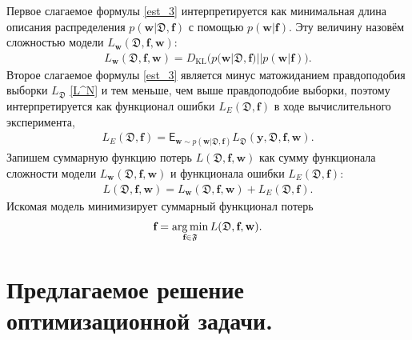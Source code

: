 \documentclass[12pt, fleqn, unicode]{article}
\newcommand{\PP}{p}
\newcommand{\DD}{{\mathfrak{D}}}
\newcommand{\FFF}{{\mathfrak{F}}}
\newcommand{\bw}{{\textbf{w}}}
\newcommand{\bbf}{{\textbf{f}}}
\newcommand{\by}{{\textbf{y}}}
\newcommand{\DKL}{\mathit{D}_{\text{KL}}}
\begin{document}
Первое слагаемое формулы \eqref{est_3} интерпретируется как минимальная длина описания распределения $\PP(\bw|\DD,\bbf)$ с помощью $\PP(\bw|\bbf)$. Эту величину назовём сложностью модели $L_\bw(\DD,\bbf,\bw)$:
\begin{gather}
	L_\bw(\DD,\bbf,\bw) = \DKL\bigl(\PP(\bw|\DD,\bbf)||\PP(\bw|\bbf)\bigr). \label{complexity}
\end{gather}
Второе слагаемое формулы \eqref{est_3} является минус матожиданием правдоподобия выборки $L_\DD$ \eqref{L^N} и тем меньше, чем выше правдоподобие выборки, поэтому интерпретируется как функционал ошибки $L_E (\DD,\bbf)$ в ходе вычислительного эксперимента,
\begin{gather}
	L_E (\DD,\bbf) = \mathsf{E}_{\bw\sim \PP(\bw|\DD,\bbf)}L_\DD(\by,\DD, \bbf,\bw).
\end{gather}
Запишем суммарную функцию потерь $L(\DD,\bbf,\bw)$ как сумму функционала сложности модели $L_\bw(\DD,\bbf,\bw)$ и функционала ошибки $L_E (\DD,\bbf)$:
\begin{gather}
	L(\DD,\bbf,\bw) = L_\bw(\DD,\bbf,\bw) + L_E (\DD,\bbf) \label{loss}.
\end{gather}
Искомая модель минимизирует суммарный функционал потерь
\begin{gather}
	\bbf = \argmin_{\bbf \in \FFF}L(\DD,\bbf,\bw).
\end{gather}

\newpage
\section{Предлагаемое решение оптимизационной задачи.}
\end{document}
